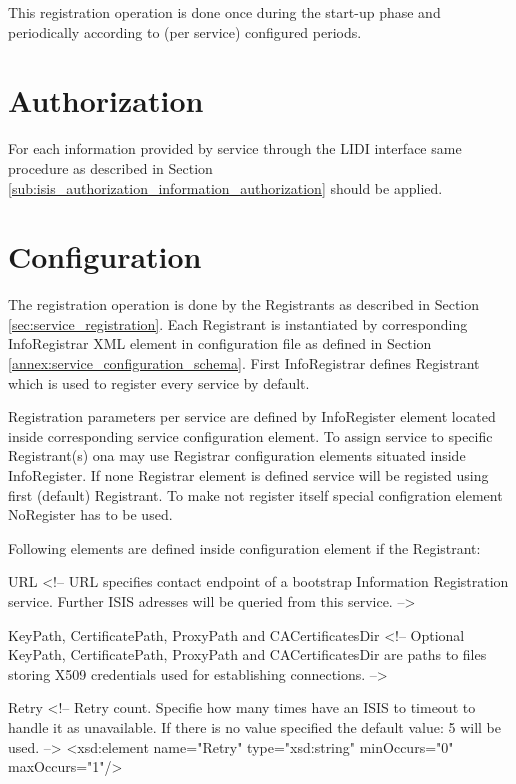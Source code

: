 \documentclass{book}
\begin{document}
This registration operation is done once during the start-up phase and periodically according to 
(per service) configured periods.



\section{Authorization}
\label{sec:service_authorization}

For each information provided by service through the LIDI interface same procedure as described in 
Section \ref{sub:isis_authorization_information_authorization} should be applied.



\section{Configuration}
\label{sec:service_configuration}

The registration operation is done by the Registrants as described in Section \ref{sec:service_registration}.
Each Registrant is instantiated by corresponding InfoRegistrar XML element in configuration file as defined in Section \ref{annex:service_configuration_schema}. First InfoRegistrar defines Registrant which is used to register every service by default.

Registration parameters per service are defined by InfoRegister element located inside corresponding service configuration element. To assign service to specific Registrant(s) ona may use Registrar configuration elements situated inside InfoRegister. If none Registrar element is defined service will be registed using first (default) Registrant. To make not register itself special configration element NoRegister has to be used.

Following elements are defined inside configuration element if the Registrant:
\begin{description}
\item{URL}            <!-- URL specifies contact endpoint of a bootstrap Information
                 Registration service. Further ISIS adresses will be queried
                 from this service. -->
\item{KeyPath, CertificatePath, ProxyPath and CACertificatesDir}
            <!-- Optional KeyPath, CertificatePath, ProxyPath and CACertificatesDir are
                 paths to files storing X509 credentials used for establishing connections. -->
\item{Retry}            <!-- Retry count. Specifie how many times have an ISIS to timeout to handle it as
                 unavailable. If there is no value specified the default value: 5 will be used. -->
            <xsd:element name="Retry" type="xsd:string" minOccurs="0" maxOccurs="1"/>

\end{description}
\end{document}
